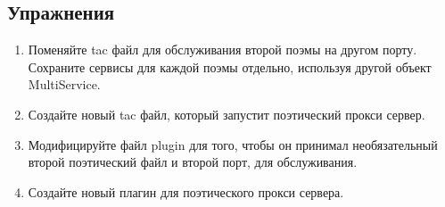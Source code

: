 \subsection{Упражнения}

\begin{enumerate}

\item Поменяйте tac файл для обслуживания второй поэмы на другом 
порту. Сохраните сервисы для каждой поэмы отдельно, используя другой 
объект MultiService.

\item Создайте новый tac файл, который запустит поэтический прокси 
сервер.

\item Модифицируйте файл plugin для того, чтобы он принимал 
необязательный второй поэтический файл и второй порт, для 
обслуживания.

\item Создайте новый плагин для поэтического прокси сервера.

\end{enumerate}




